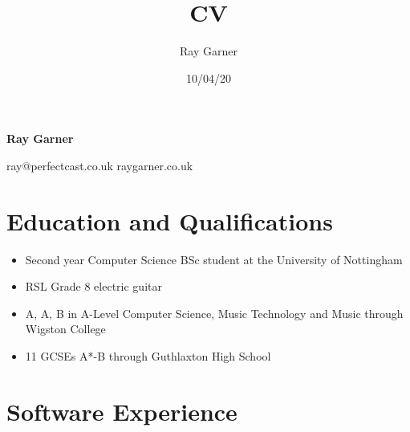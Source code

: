 \documentclass{article}
\title{CV}
\date{10/04/20}
\author{Ray Garner}
\makeatletter
\renewcommand{\maketitle}{
\vskip -5cm
\begin{center}


{\huge\bfseries
Ray Garner}

\vskip 0.25cm

{\large
ray@perfectcast.co.uk\hspace{0.5cm}
raygarner.co.uk}

\vskip 1cm

\end{center}
}
\makeatother
\begin{document}
\maketitle

\section{Education and Qualifications}

\begin{itemize}[noitemsep]

\item Second year Computer Science BSc student at the University of Nottingham
\item RSL Grade 8 electric guitar
\item A, A, B in A-Level Computer Science, Music Technology and Music through Wigston College
\item 11 GCSEs A*-B through Guthlaxton High School

\end{itemize}

\section{Software Experience}
\end{document}

